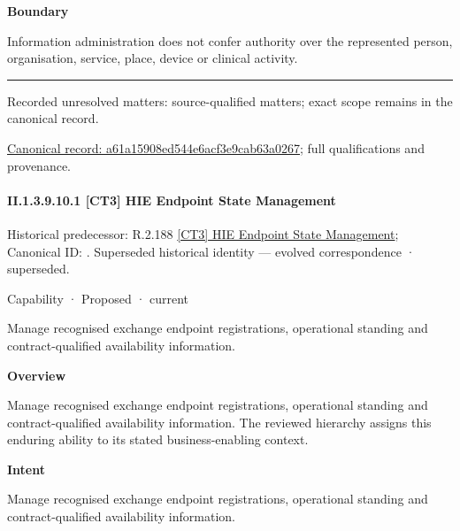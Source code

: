 \textbf{Boundary}



Information administration does not confer authority over the represented person, organisation, service, place, device or clinical activity.



\medskip\hrule\medskip

{\small Recorded unresolved matters: source-qualified matters; exact scope remains in the canonical record.}\par
{\footnotesize \href{../../../../../../../continuum/strategy/capability/a61a15908ed544e6acf3e9cab63a0267.md}{Canonical record: a61a15908ed544e6acf3e9cab63a0267}; full qualifications and provenance.}\par
\paragraph*{II.1.3.9.10.1 [CT3] HIE Endpoint State Management}
\label{navigation:II.1.3.9.10.1}

{\small Historical predecessor: R.2.188 \hyperref[element:697de08ac49a4b7f8df7a1ed6f04210e]{[CT3] HIE Endpoint State Management}; Canonical ID: \texttt{}. Superseded historical identity — evolved correspondence · superseded.}\par
\label{element:1bec951a1c98450b8d4672c5c424f9bd}
{\small Capability · Proposed · current}\par

Manage recognised exchange endpoint registrations, operational standing and contract-qualified availability information.



\textbf{Overview}



Manage recognised exchange endpoint registrations, operational standing and contract-qualified availability information. The reviewed hierarchy assigns this enduring ability to its stated business-enabling context.



\textbf{Intent}



Manage recognised exchange endpoint registrations, operational standing and contract-qualified availability information.




